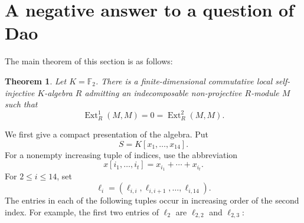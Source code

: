 \documentclass[a4paper]{amsart}
\newtheorem{theorem}{Theorem}[section]
\theoremstyle{definition}
\theoremstyle{remark}
\numberwithin{equation}{section}
\newcommand{\Ext}{\operatorname{Ext}}
\begin{document}
\section{A negative answer to a question of Dao}
The main theorem of this section is as follows:

\begin{theorem}\label{thm:commutative-ext12}
Let $K=\mathbb{F}_2$.  There is a finite-dimensional commutative local self-injective $K$-algebra $R$ admitting an indecomposable non-projective $R$-module $M$ such that
\[
 \Ext_R^1(M,M)=0=\Ext_R^2(M,M).
\]
\end{theorem}

We first give a compact presentation of the algebra.  Put
\[
 S=K[x_1,\ldots,x_{14}].
\]
For a nonempty increasing tuple of indices, use the abbreviation
\[
 x[i_1,\ldots,i_t]=x_{i_1}+\cdots+x_{i_t}.
\]
For \(2\leq i\leq14\), set
\[
 \boldsymbol{\ell}_i=(\ell_{i,i},\ell_{i,i+1},\ldots,\ell_{i,14}).
\]
The entries in each of the following tuples occur in increasing order of the second index.  For example, the first two entries of $\boldsymbol{\ell}_2$ are $\ell_{2,2}$ and $\ell_{2,3}$:
\end{document}
